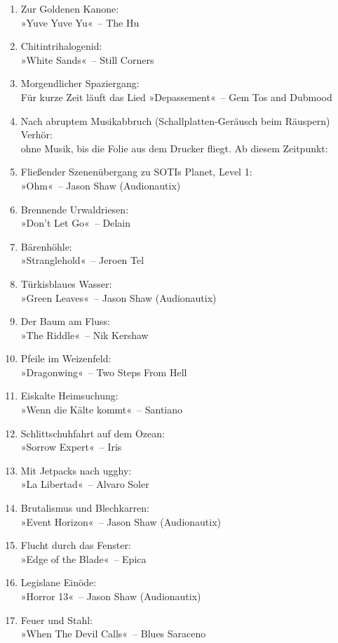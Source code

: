 \begin{enumerate}
    \item Zur Goldenen Kanone:\\ »Yuve Yuve Yu«~– The Hu
    \item Chitintrihalogenid:\\ »White Sands«~– Still Corners
    \item Morgendlicher Spaziergang:\\ Für kurze Zeit läuft das Lied »Depassement«~– Gem Tos and Dubmood
    \item Nach abruptem Musikabbruch (Schallplatten-Geräusch beim Räuspern) Verhör:\\ ohne Musik, bis die Folie aus dem Drucker fliegt. Ab diesem Zeitpunkt:
    \item Fließender Szenenübergang zu SOTIs Planet, Level 1:\\ »Ohm«~– Jason Shaw (Audionautix)
    \item Brennende Urwaldriesen:\\ »Don’t Let Go«~– Delain
    \item Bärenhöhle:\\ »Stranglehold«~– Jeroen Tel
    \item Türkisblaues Wasser:\\ »Green Leaves«~– Jason Shaw (Audionautix)
    \item Der Baum am Fluss:\\ »The Riddle«~– Nik Kershaw
    \item Pfeile im Weizenfeld:\\ »Dragonwing«~– Two Steps From Hell
    \item Eiskalte Heimsuchung:\\ »Wenn die Kälte kommt«~– Santiano
    \item Schlittschuhfahrt auf dem Ozean:\\ »Sorrow Expert«~– Iris
    \item Mit Jetpacks nach ugghy:\\ »La Libertad«~– Alvaro Soler
    \item Brutalismus und Blechkarren:\\ »Event Horizon«~– Jason Shaw (Audionautix)
    \item Flucht durch das Fenster:\\ »Edge of the Blade«~– Epica
    \item Legislane Einöde:\\ »Horror 13«~– Jason Shaw (Audionautix)
    \item Feuer und Stahl:\\ »When The Devil Calls«~– Blues Saraceno

\end{enumerate}
